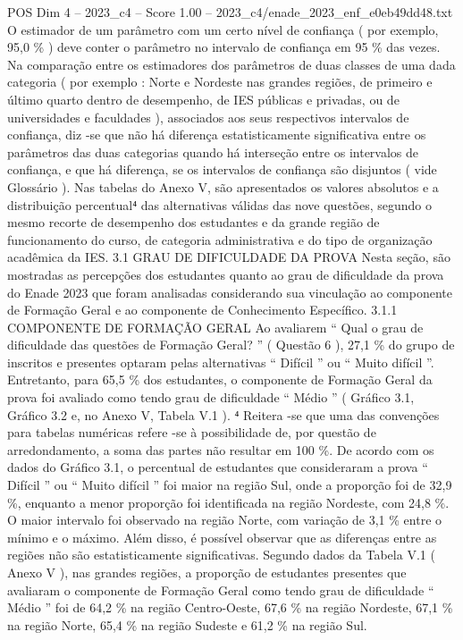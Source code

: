 \begin{textsample}{POS Dim 4 – 2023\_c4 – Score 1.00 – 2023\_c4/enade\_2023\_enf\_e0eb49dd48.txt}
O estimador de um parâmetro com um certo nível de confiança ( por exemplo, 95,0 \% ) deve conter o parâmetro no intervalo de confiança em 95 \% das vezes.
Na comparação entre os estimadores dos parâmetros de duas classes de uma dada categoria ( por exemplo : Norte e Nordeste nas grandes regiões, de primeiro e último quarto dentro de desempenho, de IES públicas e privadas, ou de universidades e faculdades ), associados aos seus respectivos intervalos de confiança, diz -se que não há diferença estatisticamente significativa entre os parâmetros das duas categorias quando há interseção entre os intervalos de confiança, e que há diferença, se os intervalos de confiança são disjuntos ( vide Glossário ).
Nas tabelas do Anexo V, são apresentados os valores absolutos e a distribuição percentual⁴ das alternativas válidas das nove questões, segundo o mesmo recorte de desempenho dos estudantes e da grande região de funcionamento do curso, de categoria administrativa e do tipo de organização acadêmica da IES. 3.1 GRAU DE DIFICULDADE DA PROVA Nesta seção, são mostradas as percepções dos estudantes quanto ao grau de dificuldade da prova do Enade 2023 que foram analisadas considerando sua vinculação ao componente de Formação Geral e ao componente de Conhecimento Específico. 3.1.1 COMPONENTE DE FORMAÇÃO GERAL Ao avaliarem “ Qual o grau de dificuldade das questões de Formação Geral? ” ( Questão 6 ), 27,1 \% do grupo de inscritos e presentes optaram pelas alternativas “ Difícil ” ou “ Muito difícil ”.
Entretanto, para 65,5 \% dos estudantes, o componente de Formação Geral da prova foi avaliado como tendo grau de dificuldade “ Médio ” ( Gráfico 3.1, Gráfico 3.2 e, no Anexo V, Tabela V.1 ). ⁴ Reitera -se que uma das convenções para tabelas numéricas refere -se à possibilidade de, por questão de arredondamento, a soma das partes não resultar em 100 \%.
De acordo com os dados do Gráfico 3.1, o percentual de estudantes que consideraram a prova “ Difícil ” ou “ Muito difícil ” foi maior na região Sul, onde a proporção foi de 32,9 \%, enquanto a menor proporção foi identificada na região Nordeste, com 24,8 \%.
O maior intervalo foi observado na região Norte, com variação de 3,1 \% entre o mínimo e o máximo.
Além disso, é possível observar que as diferenças entre as regiões não são estatisticamente significativas.
Segundo dados da Tabela V.1 ( Anexo V ), nas grandes regiões, a proporção de estudantes presentes que avaliaram o componente de Formação Geral como tendo grau de dificuldade “ Médio ” foi de 64,2 \% na região Centro-Oeste, 67,6 \% na região Nordeste, 67,1 \% na região Norte, 65,4 \% na região Sudeste e 61,2 \% na região Sul.

\end{textsample}
